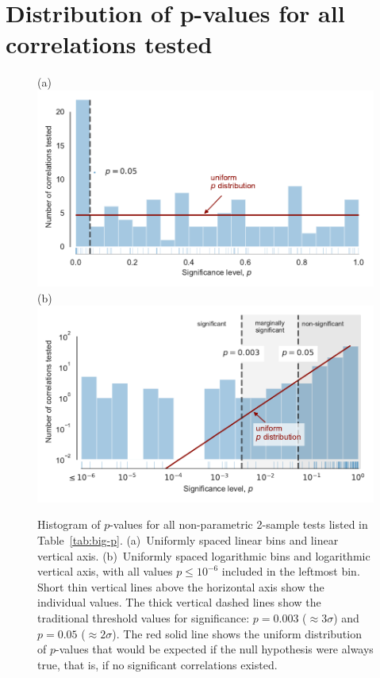 
\section{Distribution of p-values for all correlations tested}
\label{sec:distr-p-values}

\begin{figure}
  (a)\\
  \includegraphics[width=\linewidth]{figs/p-value-histogram-new-linear}\\
  (b)\\
  \includegraphics[width=\linewidth]{figs/p-value-histogram-new}
  \caption{Histogram of \(p\)-values for all non-parametric 2-sample
    tests listed in Table~\ref{tab:big-p}. (a)~Uniformly spaced linear
    bins and linear vertical axis. (b)~Uniformly spaced logarithmic
    bins and logarithmic vertical axis, with all values
    \(p \le 10^{-6}\) included in the leftmost bin.  Short thin vertical
    lines above the horizontal axis show the individual values.  The
    thick vertical dashed lines show the traditional threshold values
    for significance: \(p = 0.003\) (\(\approx 3 \sigma\)) and
    \(p = 0.05\) (\(\approx 2 \sigma\)). The red solid line shows the uniform
    distribution of \(p\)-values that would be expected if the null
    hypothesis were always true, that is, if no significant
    correlations existed.}
  \label{fig:histo-p-values}
\end{figure}

